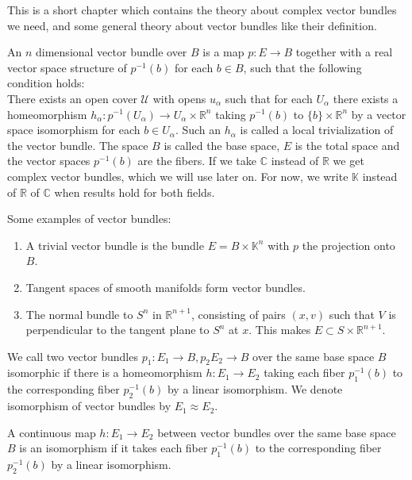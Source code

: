 \documentclass[../Thesis.tex]{subfiles}
\begin{document}
This is a short chapter which contains the theory about complex vector bundles we need, and some general theory about vector bundles like their definition.
\begin{mydef}
An $n$ dimensional vector bundle over $B$ is a map $p : E \rightarrow B$ together with a real vector space structure of $p^{-1}(b)$ for each $b \in B$, such that the following condition holds: 
\\There exists an open cover $\mathcal{U}$ with opens $u_\alpha$ such that for each $U_\alpha$ there exists a homeomorphism $h_\alpha : p^{-1} (U_\alpha) \rightarrow U_\alpha \times \mathbb{R}^n$ taking $p^{-1}(b)$ to $\{ b\} \times \mathbb{R}^n$ by a vector space isomorphism for each $b \in U_\alpha$. Such an $h_\alpha$ is called a local trivialization of the vector bundle. The space $B$ is called the base space, $E$ is the total space and the vector spaces $p^{-1}(b)$ are the fibers. If we take $\mathbb{C}$ instead of $\mathbb{R}$ we get complex vector bundles, which we will use later on. For now, we write $\mathbb{K}$ instead of $\mathbb{R}$ of $\mathbb{C}$ when results hold for both fields.

\end{mydef}
Some examples of vector bundles:
\begin{enumerate}
\item A trivial vector bundle is the bundle $E = B \times \mathbb{K}^n$ with $p$ the projection onto $B$.
\item Tangent spaces of smooth manifolds form vector bundles.
\item The normal bundle to $S^n$ in $\mathbb{R}^{n+1}$, consisting of pairs $(x,v)$ such that $V$ is perpendicular to the tangent plane to $S^n$ at $x$. This makes $E \subset S \times \mathbb{R}^{n+1}$. 
\end{enumerate}
\begin{mydef}
We call two vector bundles $p_1 :E_1 \rightarrow B, p_2 E_2 \rightarrow B$ over the same base space $B$ isomorphic if there is a homeomorphism $h: E_1 \rightarrow E_2$ taking each fiber $p_1^{-1} (b)$ to the corresponding fiber $p_2^{-1}(b)$ by a linear isomorphism. We denote isomorphism of vector bundles by $E_1 \approx E_2$.
\end{mydef}
\begin{lemma}
A continuous map $h :E_1 \rightarrow E_2$ between vector bundles over the same base space $B$ is an isomorphism if it takes each fiber $p_1^{-1}(b)$ to the corresponding fiber $p_2^{-1}(b)$ by a linear isomorphism.
\end{lemma}
\end{document}
